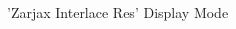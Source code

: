\clearpage
\begin{figure}[H]
    \centering
    \begin{adjustbox}{width=12cm,center}
    \end{adjustbox}
\caption{'Zarjax Interlace Res' Display Mode}
\end{figure}
\clearpage
